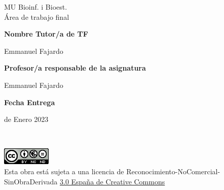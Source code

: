 \documentclass[a4paper,12pt]{article}
\newcommand{\thissupervisor}{Emmanuel Fajardo}
\newcommand{\thisPRA}{Emmanuel Fajardo}
\newcommand{\duedate}{10 de Enero 2023}
\begin{document}
\begin{minipage}{\paperwidth}
\begin{minipage}{0.45\paperwidth}
        {\fontsize{24pt}{1cm}\selectfont MU Bioinf. i Bioest.\\
        Área de trabajo final}\\
        
        \vspace{0.5cm}
        
        \fontsize{24pt}{1cm}\textbf{Nombre Tutor/a de TF}\\

        \vspace{0.1cm}

        {\fontsize{21pt}{1cm}\selectfont \thissupervisor}\\

        \vspace{0.1cm}

        \fontsize{24pt}{1cm}\textbf{Profesor/a responsable de la asignatura}\\

        \vspace{0.1cm}

        {\fontsize{21pt}{1cm}\selectfont \thisPRA}\\

        \vspace{0.5cm}

        \fontsize{21pt}{1cm}\textbf{Fecha Entrega}\\

        \vspace{0.5cm}

        {\fontsize{21pt}{1cm}\selectfont \duedate}

        \vspace{2cm}
    \end{minipage}
\end{minipage}

\pagebreak


\restoregeometry

\thispagestyle{UOCfooterpage}
~
\vfill
\begin{minipage}[l]{0.4\paperwidth}
    \includegraphics{assets/license.png}\\
    Esta obra está sujeta a una licencia de Reconocimiento-NoComercial-SinObraDerivada \href{http://creativecommons.org/licenses/by-nc-nd/3.0/es/
        }{3.0 España de Creative Commons}    
\end{minipage}
\pagebreak
\end{document}
